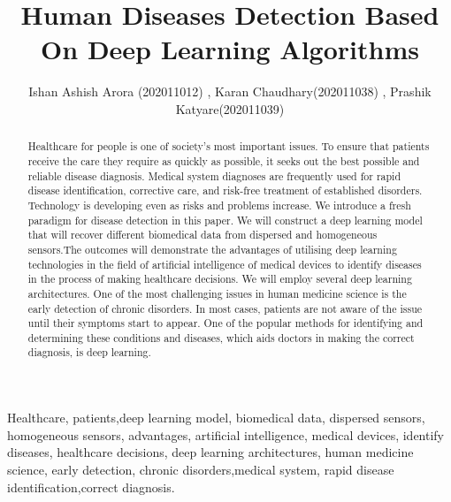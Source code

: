 \documentclass[journal]{IEEEtran}
\begin{document}
\title{ Human Diseases Detection Based On Deep Learning Algorithms }
\author{Ishan Ashish Arora {(202011012)}
	, Karan Chaudhary{(202011038)}  
        , Prashik Katyare{(202011039)}}
\vspace{-0.5cm}

\maketitle

\begin{abstract}
Healthcare for people is one of society's most important issues. To ensure that patients receive the care they require as quickly as possible, it seeks out the best possible and reliable disease diagnosis. Medical system diagnoses are frequently used for rapid disease identification, corrective care, and risk-free treatment of established disorders. Technology is developing even as risks and problems increase. We introduce a fresh paradigm for disease detection in this paper. We will construct a deep learning model that will recover different biomedical data from dispersed and homogeneous sensors.The outcomes will demonstrate the advantages of utilising deep learning technologies in the field of artificial intelligence of medical devices to identify diseases in the process of making healthcare decisions. We will employ several deep learning architectures. One of the most challenging issues in human medicine science is the early detection of chronic disorders. In most cases, patients are not aware of the issue until their symptoms start to appear. One of the popular methods for identifying and determining these conditions and diseases, which aids doctors in making the correct diagnosis, is deep learning.
\end{abstract}
\cite{ijrasetDiseasePrediction}\cite{Deep-Learing-HealthCare}\cite{Machine-learning-in-healthcare-diagnosis}
\begin{IEEEkeywords}
Healthcare, patients,deep learning model, biomedical data, dispersed sensors, homogeneous sensors, advantages, artificial intelligence, medical devices, identify diseases, healthcare decisions, deep learning architectures, human medicine science, early detection, chronic disorders,medical system, rapid disease identification,correct diagnosis.
\end{IEEEkeywords}

\IEEEpeerreviewmaketitle
\end{document}
